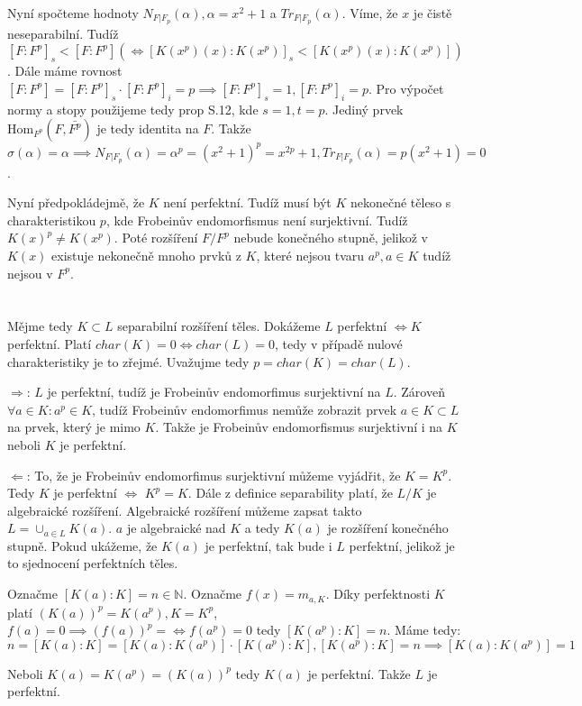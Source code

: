 \documentclass[12pt, a4paper]{article}
\begin{document}
Nyní spočteme hodnoty $N_{F|F_p}(\alpha), \alpha=x^2+1$ a $Tr_{F|F_p}(\alpha)$. Víme, že $x$ je čistě neseparabilní. Tudíž $[F:F^p]_s < [F:F^p] (\iff [K(x^p)(x):K(x^p)]_s < [K(x^p)(x):K(x^p)])$. Dále máme rovnost $[F:F^p] = [F:F^p]_s \cdot [F:F^p]_i = p \implies [F:F^p]_s = 1, [F:F^p]_i = p$. Pro výpočet normy a stopy použijeme tedy prop S.12, kde $s=1, t=p$. Jediný prvek $\text{Hom}_{F^p}(F,\bar{F^p})$ je tedy identita na $F$. Takže $\sigma(\alpha)=\alpha \implies N_{F|F_p}(\alpha) = \alpha^p = (x^2+1)^p = x^{2p}+1, Tr_{F|F_p}(\alpha) = p(x^2+1) = 0$. 

Nyní předpokládejmě, že $K$ není perfektní. Tudíž musí být $K$ nekonečné těleso s charakteristikou $p$, kde Frobeinův endomorfismus není surjektivní. Tudíž $K(x)^p \neq K(x^p)$. Poté rozšíření $F/F^p$ nebude konečného stupně, jelikož v $K(x)$ existuje nekonečně mnoho prvků z $K$, které nejsou tvaru $a^p, a \in K$ tudíž nejsou v $F^p$.

\section{}
Mějme tedy $K \subset L$ separabilní rozšíření těles. Dokážeme $L$ perfektní $\iff K$ perfektní. Platí $char(K) = 0 \iff char(L) = 0$, tedy v případě nulové charakteristiky je to zřejmé. Uvažujme tedy $p = char(K) = char(L)$.

$\Rightarrow$: $L$ je perfektní, tudíž je Frobeinův endomorfimus surjektivní na $L$. Zároveň $\forall a \in K: a^p \in K$, tudíž Frobeinův endomorfimus nemůže zobrazit prvek $a \in K \subset L$ na prvek, který je mimo $K$. Takže je Frobeinův endomorfismus surjektivní i na $K$ neboli $K$ je perfektní.

$\Leftarrow$: To, že je Frobeinův endomorfimus surjektivní můžeme vyjádřit, že $K = K^p$. Tedy $K$ je perfektní $\iff$ $K^p = K$. Dále z definice separability platí, že $L/K$ je algebraické rozšíření. Algebraické rozšíření můžeme zapsat takto $L = \cup_{a\in L} K(a)$. $a$ je algebraické nad $K$ a tedy $K(a)$ je rozšíření konečného stupně. Pokud ukážeme, že $K(a)$ je perfektní, tak bude i $L$ perfektní, jelikož je to sjednocení perfektních těles.

Označme $[K(a):K]=n \in \mathbb{N}$. Označme $f(x)=m_{a,K}$. Díky perfektnosti $K$ platí $(K(a))^p = K(a^p), K = K^p$, $f(a)=0 \implies (f(a))^p = \iff f(a^p)=0$ tedy $[K(a^p):K] = n$. Máme tedy:
\[
n=[K(a):K]=[K(a):K(a^p)]\cdot [K(a^p):K], [K(a^p):K] =n \implies [K(a):K(a^p)] = 1
\]

Neboli $K(a)=K(a^p)=(K(a))^p$ tedy $K(a)$ je perfektní. Takže $L$ je perfektní.
\end{document}
